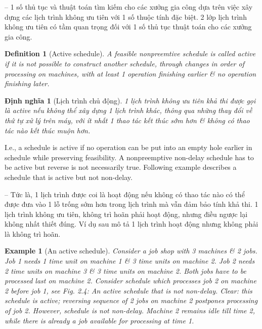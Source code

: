\documentclass{article}
\newtheorem{definition}{Definition}
\newtheorem{dinhnghia}{Định nghĩa}
\newtheorem{example}{Example}
\begin{document}
\begin{itemize}
\begin{itemize}
        -- 1 số thủ tục và thuật toán tìm kiếm cho các xưởng gia công dựa trên việc xây dựng các lịch trình không ưu tiên với 1 số thuộc tính đặc biệt. 2 lớp lịch trình không ưu tiên có tầm quan trọng đối với 1 số thủ tục thuật toán cho các xưởng gia công.

        \begin{definition}[Active schedule]
            A feasible nonpreemtive schedule is called {\rm active} if it is not possible to construct another schedule, through changes in order of processing on machines, with at least 1 operation finishing earlier \& no operation finishing later.
        \end{definition}

        \begin{dinhnghia}[Lịch trình chủ động]
            1 lịch trình không ưu tiên khả thi được gọi là {\rm active} nếu không thể xây dựng 1 lịch trình khác, thông qua những thay đổi về thứ tự xử lý trên máy, với ít nhất 1 thao tác kết thúc sớm hơn \& không có thao tác nào kết thúc muộn hơn.
        \end{dinhnghia}
        I.e., a schedule is active if no operation can be put into an empty hole earlier in schedule while preserving feasibility. A nonpreemptive non-delay schedule has to be active but reverse is not necessarily true. Following example describes a schedule that is active but not non-delay.

        -- Tức là, 1 lịch trình được coi là hoạt động nếu không có thao tác nào có thể được đưa vào 1 lỗ trống sớm hơn trong lịch trình mà vẫn đảm bảo tính khả thi. 1 lịch trình không ưu tiên, không trì hoãn phải hoạt động, nhưng điều ngược lại không nhất thiết đúng. Ví dụ sau mô tả 1 lịch trình hoạt động nhưng không phải là không trì hoãn.

        \begin{example}[An active schedule]
            Consider a job shop with 3 machines \& 2 jobs. Job 1 needs 1 time unit on machine 1 \& 3 time units on machine 2. Job 2 needs 2 time units on machine 3 \& 3 time units on machine 2. Both jobs have to be processed last on machine 2. Consider schedule which processes job 2 on machine 2 before job 1, see {\sf Fig. 2.4: An active schedule that is not non-delay}. Clear: this schedule is active; reversing sequence of 2 jobs on machine 2 postpones processing of job 2. However, schedule is not non-delay. Machine 2 remains idle till time 2, while there is already a job available for processing at time 1.


\end{example}
\end{itemize}
\end{itemize}
\end{document}
